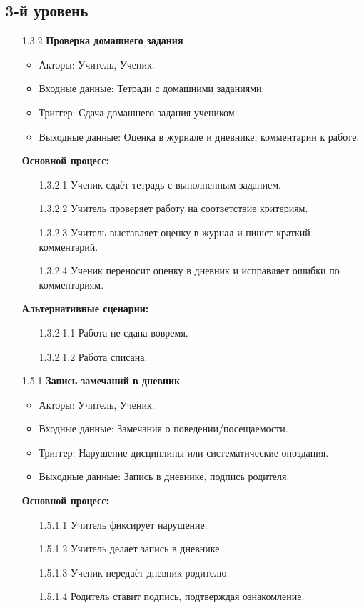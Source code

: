 \documentclass[a4paper, final]{article}
\begin{document}
\subsection{3-й уровень}
\begin{enumerate}
  \item[1.3.2] \textbf{Проверка домашнего задания}
  \begin{itemize}
    \item Акторы: Учитель, Ученик.
    \item Входные данные: Тетради с домашними заданиями.
    \item Триггер: Сдача домашнего задания учеником.
    \item Выходные данные: Оценка в журнале и дневнике, комментарии к работе.
  \end{itemize}

  \textbf{Основной процесс:}
  \begin{enumerate}
    \item[1.3.2.1] Ученик сдаёт тетрадь с выполненным заданием.
    \item[1.3.2.2] Учитель проверяет работу на соответствие критериям.
    \item[1.3.2.3] Учитель выставляет оценку в журнал и пишет краткий комментарий.
    \item[1.3.2.4] Ученик переносит оценку в дневник и исправляет ошибки по комментариям.
  \end{enumerate}

  \textbf{Альтернативные сценарии:}
  \begin{itemize}
    \item[1.3.2.1.1] Работа не сдана вовремя.
    \item[1.3.2.1.2] Работа списана. 
  \end{itemize}

  \item[1.5.1] \textbf{Запись замечаний в дневник}
  \begin{itemize}
    \item Акторы: Учитель, Ученик.
    \item Входные данные: Замечания о поведении/посещаемости.
    \item Триггер: Нарушение дисциплины или систематические опоздания.
    \item Выходные данные:  Запись в дневнике, подпись родителя.
  \end{itemize}

  \textbf{Основной процесс:}
  \begin{enumerate}
    \item[1.5.1.1] Учитель фиксирует нарушение.
    \item[1.5.1.2] Учитель делает запись в дневнике.
    \item[1.5.1.3] Ученик передаёт дневник родителю.
    \item[1.5.1.4] Родитель ставит подпись, подтверждая ознакомление.
  \end{enumerate} 


\end{enumerate}
\end{document}

